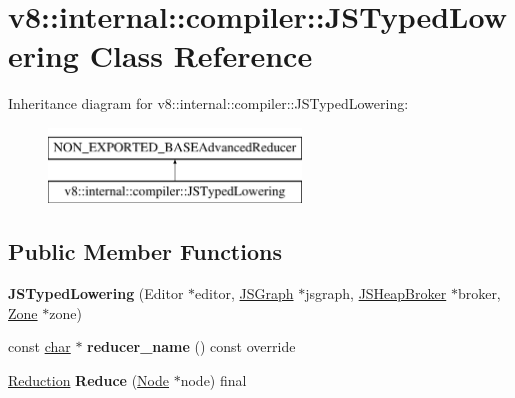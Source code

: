 \hypertarget{classv8_1_1internal_1_1compiler_1_1JSTypedLowering}{}\section{v8\+:\+:internal\+:\+:compiler\+:\+:J\+S\+Typed\+Lowering Class Reference}
\label{classv8_1_1internal_1_1compiler_1_1JSTypedLowering}
Inheritance diagram for v8\+:\+:internal\+:\+:compiler\+:\+:J\+S\+Typed\+Lowering\+:\begin{figure}[H]
\begin{center}
\leavevmode
\includegraphics[height=2.000000cm]{classv8_1_1internal_1_1compiler_1_1JSTypedLowering}
\end{center}
\end{figure}
\subsection*{Public Member Functions}
\begin{DoxyCompactItemize}
\item 
\mbox{\label{classv8_1_1internal_1_1compiler_1_1JSTypedLowering_a4d43f66c5b6663cb684db7420e4ae92e}} 
{\bfseries J\+S\+Typed\+Lowering} (Editor $\ast$editor, \mbox{\hyperlink{classv8_1_1internal_1_1compiler_1_1JSGraph}{J\+S\+Graph}} $\ast$jsgraph, \mbox{\hyperlink{classv8_1_1internal_1_1compiler_1_1JSHeapBroker}{J\+S\+Heap\+Broker}} $\ast$broker, \mbox{\hyperlink{classv8_1_1internal_1_1Zone}{Zone}} $\ast$zone)
\item 
\mbox{\label{classv8_1_1internal_1_1compiler_1_1JSTypedLowering_af941f3bccddeede12582da2dce026c62}} 
const \mbox{\hyperlink{classchar}{char}} $\ast$ {\bfseries reducer\+\_\+name} () const override
\item 
\mbox{\label{classv8_1_1internal_1_1compiler_1_1JSTypedLowering_afe3ba219125a219bab3e7ae99069630c}} 
\mbox{\hyperlink{classv8_1_1internal_1_1compiler_1_1Reduction}{Reduction}} {\bfseries Reduce} (\mbox{\hyperlink{classv8_1_1internal_1_1compiler_1_1Node}{Node}} $\ast$node) final
\end{DoxyCompactItemize}

